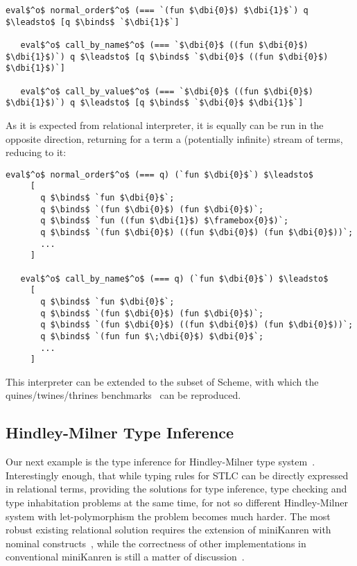 \begin{lstlisting}[basicstyle=\small]
   eval$^o$ normal_order$^o$ (=== `(fun $\dbi{0}$) $\dbi{1}$`) q $\leadsto$ [q $\binds$ `$\dbi{1}$`]
   
   eval$^o$ call_by_name$^o$ (=== `$\dbi{0}$ ((fun $\dbi{0}$) $\dbi{1}$)`) q $\leadsto$ [q $\binds$ `$\dbi{0}$ ((fun $\dbi{0}$) $\dbi{1}$)`]   

   eval$^o$ call_by_value$^o$ (=== `$\dbi{0}$ ((fun $\dbi{0}$) $\dbi{1}$)`) q $\leadsto$ [q $\binds$ `$\dbi{0}$ $\dbi{1}$`] 
\end{lstlisting}

As it is expected from relational interpreter, it is equally can be run in the opposite direction, returning for a term a (potentially infinite) stream
of terms, reducing to it:

\begin{lstlisting}[basicstyle=\small]
   eval$^o$ normal_order$^o$ (=== q) (`fun $\dbi{0}$`) $\leadsto$ 
     [
       q $\binds$ `fun $\dbi{0}$`; 
       q $\binds$ `(fun $\dbi{0}$) (fun $\dbi{0}$)`; 
       q $\binds$ `fun ((fun $\dbi{1}$) $\framebox{0}$)`; 
       q $\binds$ `(fun $\dbi{0}$) ((fun $\dbi{0}$) (fun $\dbi{0}$))`;  
       ...
     ] 

   eval$^o$ call_by_name$^o$ (=== q) (`fun $\dbi{0}$`) $\leadsto$ 
     [
       q $\binds$ `fun $\dbi{0}$`; 
       q $\binds$ `(fun $\dbi{0}$) (fun $\dbi{0}$)`; 
       q $\binds$ `(fun $\dbi{0}$) ((fun $\dbi{0}$) (fun $\dbi{0}$))`; 
       q $\binds$ `(fun fun $\;\dbi{0}$) $\dbi{0}$`; 
       ...
     ] 
\end{lstlisting}

This interpreter can be extended to the subset of Scheme, with which the quines/twines/thrines benchmarks~\cite{Untagged} can be
reproduced.

\subsection{Hindley-Milner Type Inference}

Our next example is the type inference for Hindley-Milner type system~\cite{Types}. Interestingly enough, that while typing rules for
STLC can be directly expressed in relational terms, providing the solutions for type inference, type checking and type inhabitation
problems at the same time, for not so different Hindley-Milner system with let-polymorphism the problem becomes much
harder. The most robust existing relational solution requires the extension of miniKanren with nominal constructs~\cite{alphaKanren}, while
the correctness of other implementations in conventional miniKanren is still a matter of discussion~\cite{WillOnHM}.

